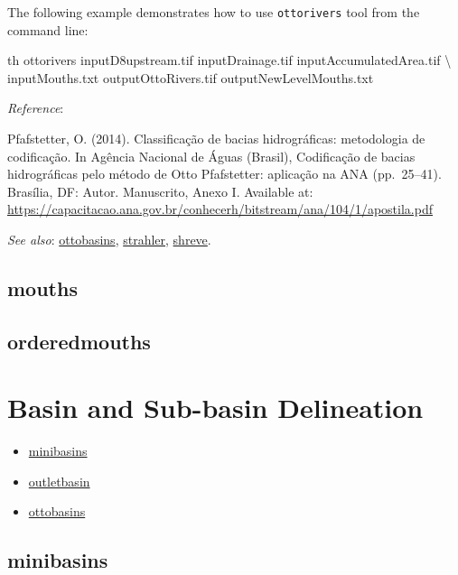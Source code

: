 \documentclass[
]{book}
\newenvironment{Shaded}{\begin{snugshade}}{\end{snugshade}}
\newcommand{\DataTypeTok}[1]{\textcolor[rgb]{0.13,0.29,0.53}{#1}}
\newcommand{\ExtensionTok}[1]{#1}
\newcommand{\NormalTok}[1]{#1}
\providecommand{\tightlist}{%
  \setlength{\itemsep}{0pt}\setlength{\parskip}{0pt}}
\begin{document}
The following example demonstrates how to use \texttt{ottorivers} tool from the command line:

\begin{Shaded}
\begin{Highlighting}[]
\ExtensionTok{th}\NormalTok{ ottorivers inputD8upstream.tif inputDrainage.tif inputAccumulatedArea.tif }\DataTypeTok{\textbackslash{}}
\NormalTok{              inputMouths.txt outputOttoRivers.tif outputNewLevelMouths.txt}
\end{Highlighting}
\end{Shaded}

\emph{Reference}:

Pfafstetter, O. (2014). Classificação de bacias hidrográficas: metodologia de codificação. In Agência Nacional de Águas (Brasil), Codificação de bacias hidrográficas pelo método de Otto Pfafstetter: aplicação na ANA (pp.~25--41). Brasília, DF: Autor. Manuscrito, Anexo I. Available at: \url{https://capacitacao.ana.gov.br/conhecerh/bitstream/ana/104/1/apostila.pdf}

\emph{See also}: \hyperref[ottobasins]{ottobasins}, \hyperref[strahler]{strahler}, \hyperref[shreve]{shreve}.

\subsection{mouths}\label{mouths}

\subsection{orderedmouths}\label{orderedmouths}

\section{Basin and Sub-basin Delineation}\label{Basin-and-Sub-basin-Delineation}

\begin{itemize}
\tightlist
\item
  \hyperref[minibasins]{minibasins}\\
\item
  \hyperref[outletbasin]{outletbasin}\\
\item
  \hyperref[ottobasins]{ottobasins}
\end{itemize}

\subsection{minibasins}\label{minibasins}
\end{document}
